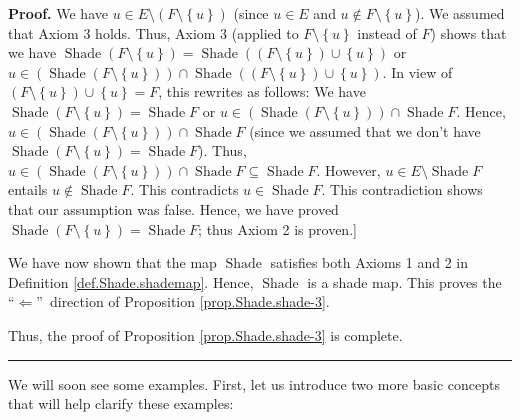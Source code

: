 \documentclass[numbers=enddot,12pt,final,onecolumn]{scrartcl}%
\theoremstyle{definition}
\newenvironment{proof}[1][Proof]{\noindent\textbf{#1.} }{\ \rule{0.5em}{0.5em}}
\newenvironment{verlong}{}{}
\begin{document}
\begin{verlong}
\begin{proof}
We have $u\in E\setminus\left(  F\setminus\left\{  u\right\}  \right)  $
(since $u\in E$ and $u\notin F\setminus\left\{  u\right\}  $). We assumed that
Axiom 3 holds. Thus, Axiom 3 (applied to $F\setminus\left\{  u\right\}  $
instead of $F$) shows that we have $\operatorname*{Shade}\left(
F\setminus\left\{  u\right\}  \right)  =\operatorname*{Shade}\left(  \left(
F\setminus\left\{  u\right\}  \right)  \cup\left\{  u\right\}  \right)  $ or
$u\in\left(  \operatorname*{Shade}\left(  F\setminus\left\{  u\right\}
\right)  \right)  \cap\operatorname*{Shade}\left(  \left(  F\setminus\left\{
u\right\}  \right)  \cup\left\{  u\right\}  \right)  $. In view of $\left(
F\setminus\left\{  u\right\}  \right)  \cup\left\{  u\right\}  =F$, this
rewrites as follows: We have $\operatorname*{Shade}\left(  F\setminus\left\{
u\right\}  \right)  =\operatorname*{Shade}F$ or $u\in\left(
\operatorname*{Shade}\left(  F\setminus\left\{  u\right\}  \right)  \right)
\cap\operatorname*{Shade}F$. Hence, $u\in\left(  \operatorname*{Shade}\left(
F\setminus\left\{  u\right\}  \right)  \right)  \cap\operatorname*{Shade}F$
(since we assumed that we don't have $\operatorname*{Shade}\left(
F\setminus\left\{  u\right\}  \right)  =\operatorname*{Shade}F$). Thus,
$u\in\left(  \operatorname*{Shade}\left(  F\setminus\left\{  u\right\}
\right)  \right)  \cap\operatorname*{Shade}F\subseteq\operatorname*{Shade}F$.
However, $u\in E\setminus\operatorname*{Shade}F$ entails $u\notin%
\operatorname*{Shade}F$. This contradicts $u\in\operatorname*{Shade}F$. This
contradiction shows that our assumption was false. Hence, we have proved
$\operatorname*{Shade}\left(  F\setminus\left\{  u\right\}  \right)
=\operatorname*{Shade}F$; thus Axiom 2 is proven.]

We have now shown that the map $\operatorname*{Shade}$ satisfies both Axioms 1
and 2 in Definition \ref{def.Shade.shademap}. Hence, $\operatorname*{Shade}$
is a shade map. This proves the \textquotedblleft$\Longleftarrow
$\textquotedblright\ direction of Proposition \ref{prop.Shade.shade-3}.

Thus, the proof of Proposition \ref{prop.Shade.shade-3} is complete.
\end{proof}
\end{verlong}

We will soon see some examples. First, let us introduce two more basic
concepts that will help clarify these examples:
\end{document}
